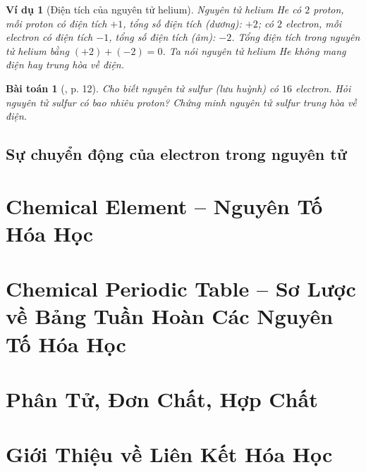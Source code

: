 \documentclass{article}
\newtheorem{baitoan}{Bài toán}
\newtheorem{vidu}{Ví dụ}
\begin{document}
\begin{vidu}[Điện tích của nguyên tử helium]
	Nguyên tử helium \emph{He} có $2$ proton, mỗi proton có điện tích $+1$, tổng số điện tích (dương): $+2$; có $2$ electron, mỗi electron có điện tích $-1$, tổng số điện tích (âm): $-2$. Tổng điện tích trong nguyên tử helium bằng $(+2) + (-2) = 0$. Ta nói nguyên tử helium \emph{He} \emph{không mang điện} hay \emph{trung hòa về điện}.
\end{vidu}

\begin{baitoan}[\cite{SGK_KHTN_7_Canh_Dieu}, p. 12]
	Cho biết nguyên tử sulfur (lưu huỳnh) có $16$ electron. Hỏi nguyên tử sulfur có bao nhiêu proton? Chứng minh nguyên tử sulfur trung hòa về điện.
\end{baitoan}

\subsection{Sự chuyển động của electron trong nguyên tử}


\section{Chemical Element -- Nguyên Tố Hóa Học}


\section{Chemical Periodic Table -- Sơ Lược về Bảng Tuần Hoàn Các Nguyên Tố Hóa Học}


\section{Phân Tử, Đơn Chất, Hợp Chất}


\section{Giới Thiệu về Liên Kết Hóa Học}
\end{document}
